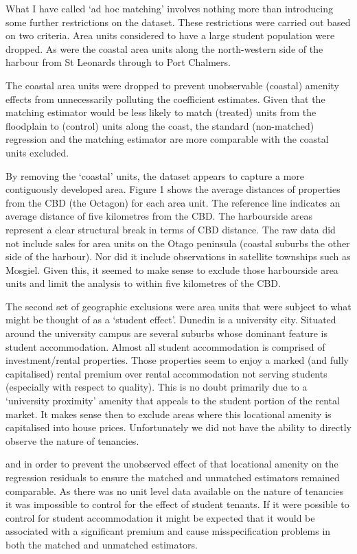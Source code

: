 \documentclass[]{article}
\begin{document}
What I have called `ad hoc matching' involves nothing more than
introducing some further restrictions on the dataset. These restrictions
were carried out based on two criteria. Area units considered to have a
large student population were dropped. As were the coastal area units
along the north-western side of the harbour from St Leonards through to
Port Chalmers.

The coastal area units were dropped to prevent unobservable (coastal)
amenity effects from unnecessarily polluting the coefficient estimates.
Given that the matching estimator would be less likely to match
(treated) units from the floodplain to (control) units along the coast,
the standard (non-matched) regression and the matching estimator are
more comparable with the coastal units excluded.

By removing the `coastal' units, the dataset appears to capture a more
contiguously developed area. Figure 1 shows the average distances of
properties from the CBD (the Octagon) for each area unit. The reference
line indicates an average distance of five kilometres from the CBD. The
harbourside areas represent a clear structural break in terms of CBD
distance. The raw data did not include sales for area units on the Otago
peninsula (coastal suburbs the other side of the harbour). Nor did it
include observations in satellite townships such as Mosgiel. Given this,
it seemed to make sense to exclude those harbourside area units and
limit the analysis to within five kilometres of the CBD.

The second set of geographic exclusions were area units that were
subject to what might be thought of as a `student effect'. Dunedin is a
university city. Situated around the university campus are several
suburbs whose dominant feature is student accommodation. Almost all
student accommodation is comprised of investment/rental properties.
Those properties seem to enjoy a marked (and fully capitalised) rental
premium over rental accommodation not serving students (especially with
respect to quality). This is no doubt primarily due to a `university
proximity' amenity that appeals to the student portion of the rental
market. It makes sense then to exclude areas where this locational
amenity is capitalised into house prices. Unfortunately we did not have
the ability to directly observe the nature of tenancies.

and in order to prevent the unobserved effect of that locational amenity
on the regression residuals to ensure the matched and unmatched
estimators remained comparable. As there was no unit level data
available on the nature of tenancies it was impossible to control for
the effect of student tenants. If it were possible to control for
student accommodation it might be expected that it would be associated
with a significant premium and cause misspecification problems in both
the matched and unmatched estimators.
\end{document}
